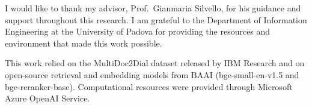 
I would like to thank my advisor, Prof.\ Gianmaria Silvello, for his guidance and support
throughout this research. I am grateful to the Department of Information Engineering at
the University of Padova for providing the resources and environment that made this work
possible.

This work relied on the MultiDoc2Dial dataset released by IBM Research and on open-source
retrieval and embedding models from BAAI (bge-small-en-v1.5 and bge-reranker-base).
Computational resources were provided through Microsoft Azure OpenAI Service.
